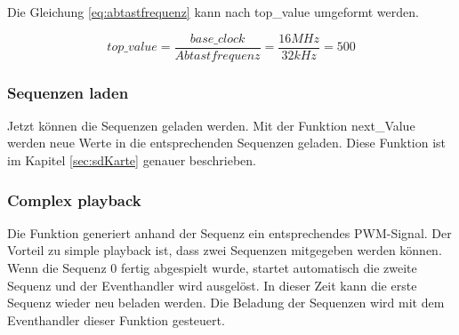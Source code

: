 Die Gleichung \ref{eq:abtastfrequenz} kann nach top\_value umgeformt werden.

\begin{equation}
top\_value = \frac{base\_clock}{Abtastfrequenz} = \frac{16MHz}{32kHz} = 500
\end{equation}

\subsubsection*{Sequenzen laden}\label{sec:Sequenzen befüllen}
Jetzt können die Sequenzen geladen werden. Mit der Funktion next\_Value werden neue Werte in die entsprechenden Sequenzen geladen. Diese Funktion ist im Kapitel \ref{sec:sdKarte} genauer beschrieben.

\subsubsection*{Complex playback}\label{sec:Complex playback}
Die Funktion generiert anhand der Sequenz ein entsprechendes PWM-Signal. Der
Vorteil zu simple playback ist, dass zwei Sequenzen mitgegeben werden können. Wenn die Sequenz 0 fertig abgespielt wurde, startet automatisch die zweite Sequenz und der Eventhandler wird ausgelöst. In dieser Zeit kann die erste Sequenz wieder neu beladen werden. Die Beladung der Sequenzen wird mit dem Eventhandler dieser Funktion gesteuert. 
